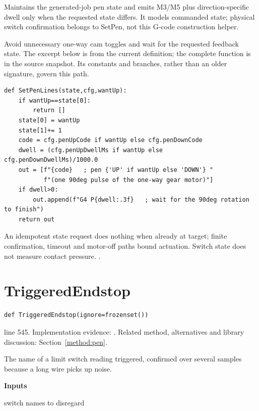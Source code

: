 Maintains the generated-job pen state and emits M3/M5 plus direction-specific dwell only when the requested state differs. It models commanded state; physical switch confirmation belongs to SetPen, not this G-code construction helper.


Avoid unnecessary one-way cam toggles and wait for the requested feedback state. The excerpt below is from the current definition; the complete function is in the source snapshot. Its constants and branches, rather than an older signature, govern this path.


\begin{lstlisting}[style=plain]
def SetPenLines(state,cfg,wantUp):
    if wantUp==state[0]:
        return []
    state[0] = wantUp
    state[1]+= 1
    code = cfg.penUpCode if wantUp else cfg.penDownCode
    dwell = (cfg.penUpDwellMs if wantUp else cfg.penDownDwellMs)/1000.0
    out = [f"{code}   ; pen {'UP' if wantUp else 'DOWN'} "
           f"(one 90deg pulse of the one-way gear motor)"]
    if dwell>0:
        out.append(f"G4 P{dwell:.3f}   ; wait for the 90deg rotation to finish")
    return out
\end{lstlisting}
An idempotent state request does nothing when already at target; finite confirmation, timeout and motor-off paths bound actuation. Switch state does not measure contact pressure. \cite{kernelgpio,rohmnpn,code2026}.


\section{TriggeredEndstop}\label{fn:reproduce:TriggeredEndstop}
\begin{lstlisting}[style=sig]
def TriggeredEndstop(ignore=frozenset())
\end{lstlisting}
 line 545. Implementation evidence: \cite{code2026}. Related method, alternatives and library discussion: Section~\ref{method:pen}.


The name of a limit switch reading triggered, confirmed over several samples because a long wire picks up noise.




\noindent\textbf{Inputs}
\begin{description}[leftmargin=2.2em,style=nextline,font=\normalfont\ttfamily]\setlength\itemsep{1pt}
  \item[{ignore}] \normalfont switch names to disregard
\end{description}

